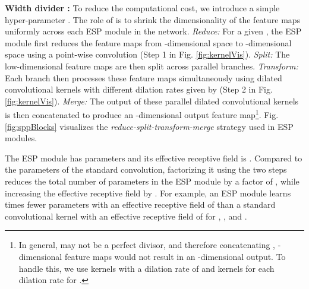 \documentclass[runningheads]{llncs}
\def\Fig{Fig. }
\begin{document}
\noindent \textbf{Width divider :} To reduce the computational cost, we introduce a simple hyper-parameter . The role of  is to shrink the dimensionality of the feature maps uniformly across each ESP module in the network. \textit{Reduce:} For a given , the ESP module first reduces the feature maps from -dimensional space to -dimensional space using a point-wise convolution (Step 1 in \Fig \ref{fig:kernelVis}). \textit{Split:} The low-dimensional feature maps are then split across  parallel branches. \textit{Transform:} Each branch then processes these feature maps simultaneously using  dilated convolutional kernels with different dilation rates given by  (Step 2 in \Fig \ref{fig:kernelVis}). \textit{Merge:} The output of these  parallel dilated convolutional kernels is then concatenated to produce an -dimensional output feature map\footnote{In general,  may not be a perfect divisor, and therefore concatenating , -dimensional feature maps would not result in an -dimensional output. To handle this, we use  kernels with a dilation rate of  and  kernels for each dilation rate  for .}. \Fig \ref{fig:sppBlocks} visualizes the \textit{reduce-split-transform-merge} strategy used in ESP modules.

The ESP module has  parameters and its effective receptive field is . Compared to the  parameters of the standard convolution,  factorizing it using the two steps reduces the total number of parameters in the ESP module by a factor of , while increasing the effective receptive field by . For example, an ESP module learns  times fewer parameters with an effective receptive field of  than a standard convolutional kernel with an effective receptive field of  for , , and .
\end{document}

